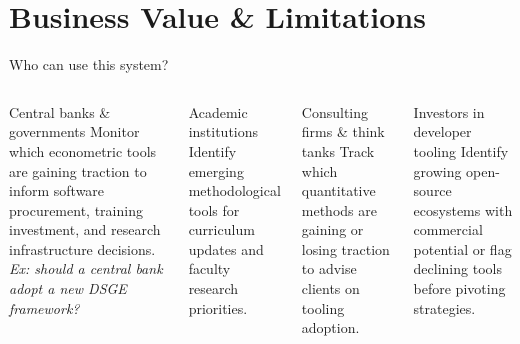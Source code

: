 \section{Business Value \& Limitations}

\begin{frame}{Who can use this system?}

  \begin{columns}
    \begin{block}{Central banks \& governments}
      Monitor which econometric tools are gaining traction to inform
      software procurement, training investment, and research infrastructure decisions.
      \textit{Ex: should a central bank adopt a new DSGE framework?}
    \end{block}

    \vspace{0.4em}

    \begin{block}{Academic institutions}
      Identify emerging methodological tools for curriculum updates and
      faculty research priorities.
    \end{block}

    \begin{block}{Consulting firms \& think tanks}
      Track which quantitative methods are gaining or losing traction to
      advise clients on tooling adoption.
    \end{block}

    \vspace{0.4em}

    \begin{block}{Investors in developer tooling}
      Identify growing open-source ecosystems with commercial potential
      or flag declining tools before pivoting strategies.
    \end{block}
  \end{columns}

\end{frame}


